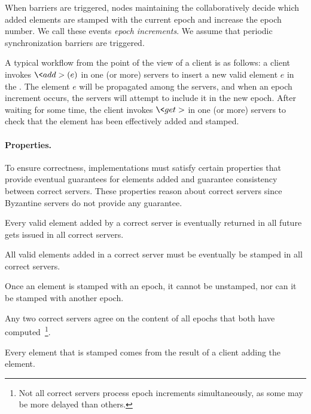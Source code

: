 
When barriers are triggered, nodes maintaining the \setchain collaboratively
decide which added elements are stamped with the current epoch and increase the
epoch number.
%
We call these events \emph{epoch increments}.
%
We assume that periodic synchronization barriers are triggered.

A typical workflow from the point of the view of a client is as follows: a
client invokes $\<add>(e)$ in one (or more) servers to insert a new valid
element $e$ in the \setchain.
%
The element $e$ will be propagated among the servers, and when an
epoch increment occurs, the servers will attempt to include it in the
new epoch.
%
After waiting for some time, the client invokes $\<get>$ in one (or
more) servers to check that the element has been effectively added and
stamped.

\paragraph*{Properties.}
To ensure correctness, \setchain implementations must satisfy certain
properties that provide eventual guarantees for elements added and
guarantee consistency between correct servers. 
%
These properties reason about correct servers since Byzantine servers
do not provide any guarantee.

\begin{compactitem}
  \item Every valid element added by a correct
server is eventually returned in all future gets issued in all correct
servers.
  \item All valid elements added in a correct server must be eventually
be stamped in all correct servers.
  \item Once an element is stamped with an epoch, it cannot be unstamped, nor
can it be stamped with another epoch.
\item Any two correct servers agree on the content of
all epochs that both have computed~\footnote{Not all correct servers process epoch increments
simultaneously, as some may be more delayed than others.}.
%
\item Every element that is stamped comes from the result of a client adding the element.
  \end{compactitem}

